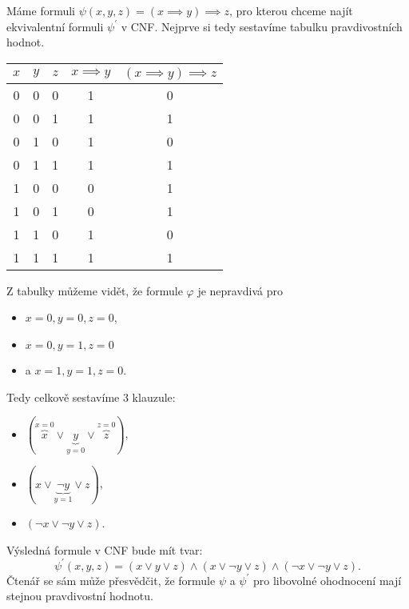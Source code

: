 \begin{example}\label{ex:prevod_cnf_1}
    Máme formuli $\psi(x,y,z)=(x\implies y)\implies z$, pro kterou chceme najít ekvivalentní formuli $\psi^\prime$ v CNF. Nejprve si tedy sestavíme tabulku pravdivostních hodnot.
    \begin{table}[h]
        \centering
        \begin{tabular}{|c|c|c|c|c|}
        \hline
        $x$ & $y$ & $z$ & $x\implies y$ & $(x\implies y)\implies z$ \\ \hline
        0   & 0   & 0   & 1             & 0                         \\ \hline
        0   & 0   & 1   & 1             & 1                         \\ \hline
        0   & 1   & 0   & 1             & 0                         \\ \hline
        0   & 1   & 1   & 1             & 1                         \\ \hline
        1   & 0   & 0   & 0             & 1                         \\ \hline
        1   & 0   & 1   & 0             & 1                         \\ \hline
        1   & 1   & 0   & 1             & 0                         \\ \hline
        1   & 1   & 1   & 1             & 1                         \\ \hline
        \end{tabular}
    \end{table}
    Z tabulky můžeme vidět, že formule $\varphi$ je nepravdivá pro
    \begin{itemize}
        \item $x=0,y=0,z=0$,
        \item $x=0,y=1,z=0$
        \item a $x=1,y=1,z=0$.
    \end{itemize}
    Tedy celkově sestavíme 3 klauzule:
    \begin{itemize}
        \item \((\overbrace{x}^{x=0}\lor \underbrace{y}_{y=0}\lor \overbrace{z}^{z=0})\),
        \item \((x\lor\underbrace{\neg y}_{y=1}\lor z)\),
        \item \((\neg x\lor\neg y\lor z)\).
    \end{itemize}
    Výsledná formule v CNF bude mít tvar:
    \[\psi^\prime(x,y,z)=(x\lor y\lor z)\land (x\lor \neg y\lor z)\land (\neg x\lor \neg y\lor z).\]
    Čtenář se sám může přesvědčit, že formule $\psi$ a $\psi^\prime$ pro libovolné ohodnocení mají stejnou pravdivostní hodnotu.
\end{example}
